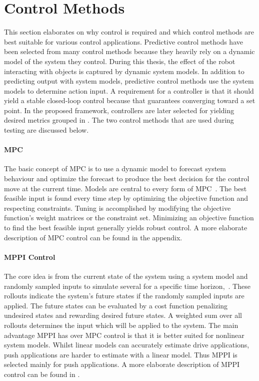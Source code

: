 \section{Control Methods}%
\label{sec:control_methods}
This section elaborates on why control is required and which control methods are best suitable for various control applications. Predictive control methods have been selected from many control methods because they heavily rely on a dynamic model of the system they control. During this thesis, the effect of the robot interacting with objects is captured by dynamic system models. In addition to predicting output with system models, predictive control methods use the system models to determine action input. A requirement for a controller is that it should yield a stable closed-loop control because that guarantees converging toward a set point. In the proposed framework, controllers are later selected for yielding desired metrics grouped in . The two control methods that are used during testing are discussed below.\bs

\paragraph{\acl{MPC}}
The basic concept of \ac{MPC} is to use a dynamic model to forecast system behaviour and optimize the forecast to produce the best decision for the control move at the current time. Models are central to every form of \ac{MPC}~\cite{rawlings_model_2020}. The best feasible input is found every time step by optimizing the objective function and respecting constraints. Tuning is accomplished by modifying the objective function's weight matrices or the constraint set. Minimizing an objective function to find the best feasible input generally yields robust control. A more elaborate description of \ac{MPC} control can be found in the appendix.\bs

\paragraph{\acl{MPPI} Control}
The core idea is from the current state of the system using a system model and randomly sampled inputs to simulate several  for a specific time horizon,~\cite{neuromorphictutorial_ltc21_2021}. These rollouts indicate the system's future states if the randomly sampled inputs are applied. The future states can be evaluated by a cost function penalizing undesired states and rewarding desired future states. A weighted sum over all rollouts determines the input which will be applied to the system. The main advantage \ac{MPPI} has over \ac{MPC} control is that it is better suited for nonlinear system models. Whilst linear models can accurately estimate drive applications, push applications are harder to estimate with a linear model. Thus \ac{MPPI} is selected mainly for push applications. A more elaborate description of \ac{MPPI} control can be found in .\bs

